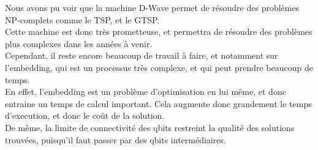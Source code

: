 \documentclass{article}
\begin{document}
        Nous avons pu voir que la machine D-Wave permet de résoudre des problèmes NP-complets comme le TSP, et le GTSP.\\
        Cette machine est donc très prometteuse, et permettra de résoudre des problèmes plus complexes dans les années à venir.\\
        Cependant, il reste encore beaucoup de travail à faire, et notamment sur l'embedding, qui est un processus très complexe, et qui peut prendre beaucoup de temps.\\
        En effet, l'embedding est un problème d'optimisation en lui même, et donc entraine un temps de calcul important.
        Cela augmente donc grandement le temps d'execution, et donc le coût de la solution.\\
        De même, la limite de connectivité des qbits restreint la qualité des solutions trouvées, puisqu'il faut passer par des qbits intermédiaires.\\





    
\end{document}
